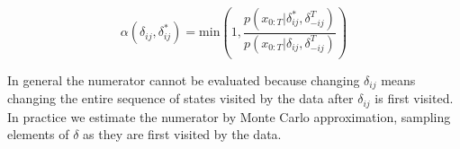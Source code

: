 \documentclass[11pt]{article}
\begin{document}
\[ \alpha(\delta_{ij},\delta_{ij}^*) =  \mathrm{min}\left(1,\frac{p(x_{0:T}|\delta_{ij}^*,\delta_{-ij}^T)}{p(x_{0:T}|\delta_{ij},\delta_{-ij}^T)}\right)\]

In general the numerator cannot be evaluated because changing $\delta_{ij}$ means changing the entire sequence of states visited by the data after $\delta_{ij}$ is first visited.  In practice we estimate the numerator by Monte Carlo approximation, sampling elements of $\delta$ as they are first visited by the data.
 
 
 
 


\end{document}
